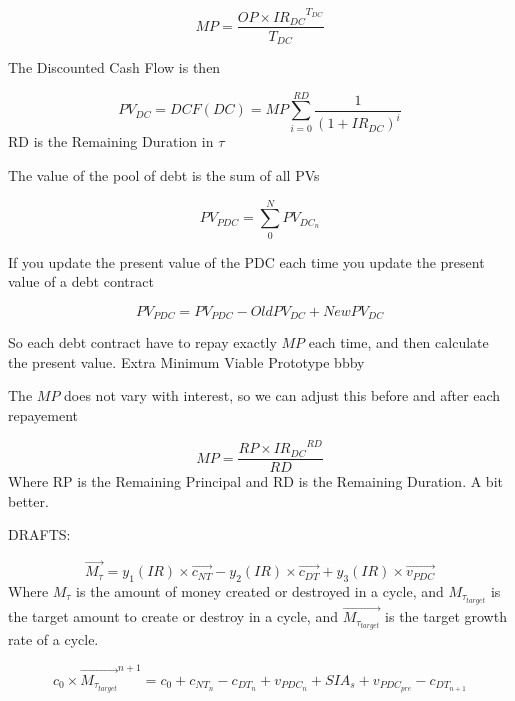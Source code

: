 \begin{equation}
    MP = \frac{OP \times {IR_{DC}}^{T_{DC}}}{T_{DC}}
\end{equation}

The Discounted Cash Flow is then 

\begin{equation}
    PV_{DC} = DCF(DC) = MP \sum_{i=0}^{RD} \frac{1}{({1+IR_{DC}})^i}
\end{equation}
RD is the Remaining Duration in $\tau$

The value of the pool of debt is the sum of all PVs 

\begin{equation}
    PV_{PDC} = \sum_{0}^{N} PV_{DC_{n}}
\end{equation}

If you update the present value of the PDC each time you update the present value of a debt contract

\begin{equation}
    PV_{PDC} = PV_{PDC} - OldPV_{DC} + NewPV_{DC}
\end{equation}

So each debt contract have to repay exactly $MP$ each time, and then calculate the present value. Extra Minimum Viable Prototype bbby

The $MP$ does not vary with interest, so we can adjust this before and after each repayement 

\begin{equation}
    MP = \frac{RP \times {IR_{DC}}^{RD}}{RD}
\end{equation}
Where RP is the Remaining Principal and RD is the Remaining Duration. A bit better.







\pagebreak
DRAFTS:

\begin{equation}
    \overrightarrow{M_{\tau}} = y_{1}(IR) \times \overrightarrow{c_{NT}} - y_{2}(IR) \times \overrightarrow{c_{DT}} + y_{3}(IR) \times \overrightarrow{v_{PDC}}
\end{equation}
Where $M_{\tau}$ is the amount of money created or destroyed in a cycle, and $M_{\tau_{target}}$ is the target amount to create or destroy in a cycle, and $ \overrightarrow{M_{\tau_{target}}}$ is the target growth rate of a cycle. 



\begin{equation}
    c_{0} \times \overrightarrow{M_{\tau_{target}}}^{n+1} = c_{0} + c_{NT_{n}} - c_{DT_{n}} + v_{PDC_{n}} + SIA_{s} + v_{PDC_{pre}} - c_{DT_{n+1}}
\end{equation}







